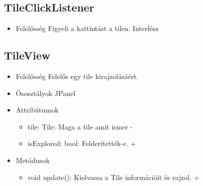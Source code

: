 \subsection{TileClickListener}
\begin{itemize}
	\item Felelősség\newline
	Figyeli a kattintást a tilen. Interfész
\end{itemize}

\subsection{TileView}
\begin{itemize}
	\item Felelősség\newline
	Felelős egy tile kirajzolásáért.
	\item Ősosztályok\newline
	JPanel
	\item Attribútumok\newline
	\begin{itemize}
		\item tile: Tile: Maga a tile amit ismer -
		\item isExplored: bool: Felderítették-e. +
	\end{itemize}
	\item Metódusok\newline
	\begin{itemize}
		\item void update(): Kiolvassa a Tile információit és rajzol. +
	\end{itemize}
\end{itemize}

